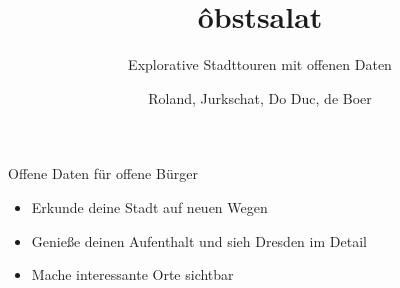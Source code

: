 \documentclass[13pt, usenames, dvipsnames]{beamer}
\title{ôbstsalat}
\subtitle{Explorative Stadttouren mit offenen Daten}
\author{Roland, Jurkschat, Do Duc, de Boer}
\begin{document}
\frame{\titlepage}

\begin{frame}{Offene Daten für offene Bürger}
    \begin{minipage}{.5\textwidth}
    \end{minipage}%
    \begin{minipage}{.5\textwidth}
        \begin{itemize}
            \item Erkunde deine Stadt auf neuen Wegen
                \pause
            \item Genieße deinen Aufenthalt und sieh Dresden im Detail
                \pause
            \item Mache interessante Orte sichtbar
        \end{itemize}
    \end{minipage}
\end{frame}
\end{document}
